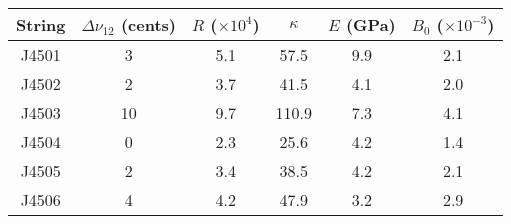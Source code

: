 \begin{tabular}{cccccc}
\toprule
String &  $\Delta \nu_{12}$ (cents) &  $R$ ($\times 10^4$) &  $\kappa$ &  $E$ (GPa) &  $B_0$ ($\times 10^{-3}$) \\
\midrule
 J4501 &                          3 &                  5.1 &      57.5 &        9.9 &                       2.1 \\
 J4502 &                          2 &                  3.7 &      41.5 &        4.1 &                       2.0 \\
 J4503 &                         10 &                  9.7 &     110.9 &        7.3 &                       4.1 \\
 J4504 &                          0 &                  2.3 &      25.6 &        4.2 &                       1.4 \\
 J4505 &                          2 &                  3.4 &      38.5 &        4.2 &                       2.1 \\
 J4506 &                          4 &                  4.2 &      47.9 &        3.2 &                       2.9 \\
\bottomrule
\end{tabular}

